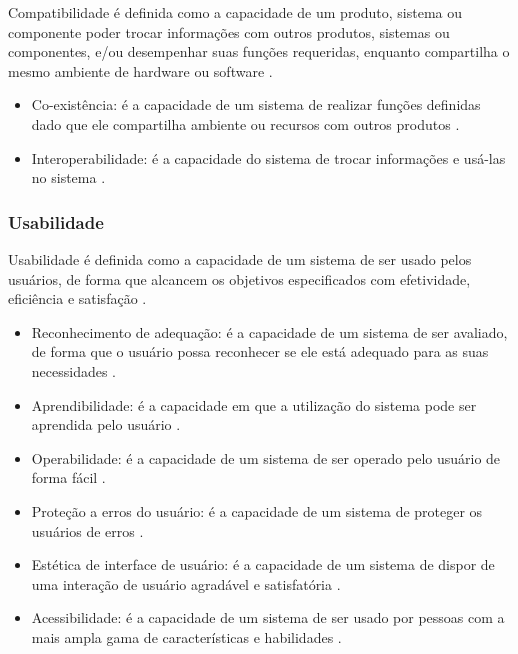 Compatibilidade é definida como a capacidade de um produto, sistema ou componente poder trocar informações com outros produtos, sistemas ou componentes, e/ou desempenhar suas funções requeridas, enquanto compartilha o mesmo ambiente de hardware ou software .

\begin{itemize}
  \item Co-existência: é a capacidade de um sistema de realizar funções definidas dado que ele compartilha ambiente ou recursos com outros produtos .
  \item Interoperabilidade: é a capacidade do sistema de trocar informações e usá-las no sistema .
\end{itemize}

\subsubsection{Usabilidade}

Usabilidade é definida como a capacidade de um sistema de ser usado pelos usuários, de forma que alcancem os objetivos especificados com efetividade, eficiência e satisfação . 

\begin{itemize}
    \item Reconhecimento de adequação: é a capacidade de um sistema de ser avaliado, de forma que o usuário possa reconhecer se ele está adequado para as suas necessidades .
    \item Aprendibilidade: é a capacidade em que a utilização do sistema pode ser aprendida pelo usuário .
    \item Operabilidade: é a capacidade de um sistema de ser operado pelo usuário de forma fácil .
    \item Proteção a erros do usuário: é a capacidade de um sistema de proteger os usuários de erros .
    \item Estética de interface de usuário: é a capacidade de um sistema de dispor de uma interação de usuário agradável e satisfatória .
    \item Acessibilidade: é a capacidade de um sistema de ser usado por pessoas com a mais ampla gama de características e habilidades .
\end{itemize}

